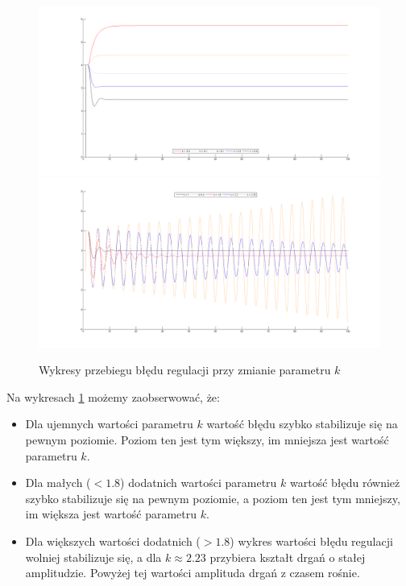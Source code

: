 \documentclass[a4paper,10pt]{article}
\begin{document}
\begin{figure}[!h]
    \centering
	\includegraphics[width=120mm]{CW5-N3C2d1-k-03-06.png}
	\includegraphics[width=120mm]{CW5-N3C2d1-k1-225.png}
	\caption{Wykresy przebiegu błędu regulacji przy zmianie parametru $k$}
    \label{fig:symulacjaP}
\end{figure}

Na wykresach \ref{fig:symulacjaP} możemy zaobserwować, że:
\begin{itemize}
	\item Dla ujemnych wartości parametru $k$ wartość błędu szybko stabilizuje się na pewnym poziomie. Poziom ten jest tym większy, im mniejsza jest wartość parametru $k$.
	\item Dla małych ($<1.8$) dodatnich wartości parametru $k$ wartość błędu również szybko stabilizuje się na pewnym poziomie, a poziom ten jest tym mniejszy, im większa jest wartość parametru $k$.
	\item Dla większych wartości dodatnich ($>1.8$) wykres wartości błędu regulacji wolniej stabilizuje się, a dla $k \approx 2.23$ przybiera kształt drgań o stałej amplitudzie. Powyżej tej wartości amplituda drgań z czasem rośnie.
\end{itemize}
\newpage
\end{document}
